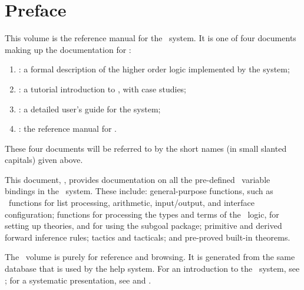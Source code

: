 \chapter*{Preface}

This volume is the reference manual for the \HOL\ system.
It is one of four documents making up the documentation for \HOL:

\begin{enumerate}
\item \LOGIC: a formal description of the higher order logic
  implemented by the \HOL{} system;
\item \TUTORIAL: a tutorial introduction to \HOL, with case studies;
\item \DESCRIPTION: a detailed user's guide for the \HOL{} system;
\item \REFERENCE: the reference manual for \HOL.
\end{enumerate}

\noindent These four documents will be referred to by the short names (in
small slanted capitals) given above.

This document, \REFERENCE, provides documentation on all the pre-defined \ML\
variable bindings in the \HOL\ system.  These include: general-purpose
functions, such as \ML\ functions for list processing, arithmetic,
input/output, and interface configuration; functions for processing the types
and terms of the \HOL\ logic, for setting up theories, and for using the
subgoal package; primitive and derived forward inference rules; tactics and
tacticals; and pre-proved built-in theorems.


The \REFERENCE\ volume is purely for reference and browsing. It is generated
from the same database that is used by the help system. For an introduction to
the \HOL\ system, see \TUTORIAL; for a systematic presentation, see
\DESCRIPTION{}  and \LOGIC{}.
